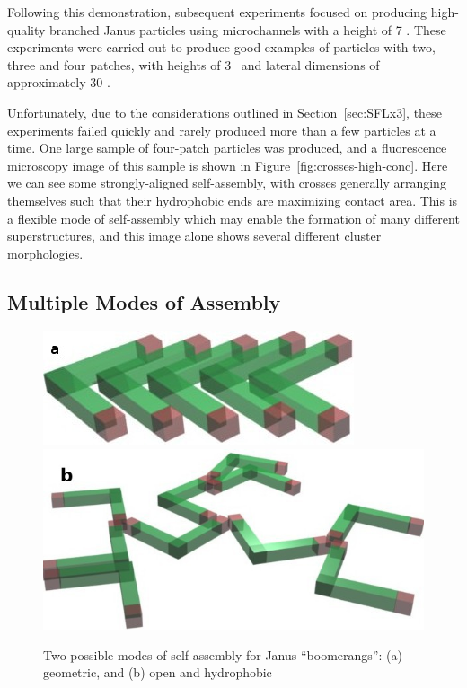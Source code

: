 Following this demonstration, subsequent experiments focused on producing high-quality 
branched Janus particles using microchannels with a height of 7 \microns.  These experiments were carried
out to produce good examples of particles with two, three and four patches, with heights of
3 \microns~and lateral dimensions of approximately 30 \microns.  

Unfortunately, due to the considerations
outlined in Section~\ref{sec:SFLx3}, these experiments failed quickly and rarely produced more than a few
particles at a time.  One large sample of four-patch particles was produced, and a fluorescence 
microscopy image of this sample is shown in Figure~\ref{fig:crosses-high-conc}.  Here we can see 
some strongly-aligned self-assembly, with crosses generally arranging themselves such that
their hydrophobic ends are maximizing contact area.  This is a flexible mode of self-assembly 
which may enable the formation of many different superstructures, and this image alone shows several different
cluster morphologies.

\subsection{Multiple Modes of Assembly}

\begin{figure}[h]
\begin{center}
\includegraphics[width=0.4\linewidth]{figures/complex-shapes/boomerangs-dense-assembly.jpg} \hfill \includegraphics[width=0.4\linewidth]{figures/complex-shapes/boomerangs-open-assembly.jpg}
\end{center}
\caption{Two possible modes of self-assembly for Janus ``boomerangs'': (a) geometric, and (b) open and hydrophobic}
\label{fig:boomerang-assembly}
\end{figure}


